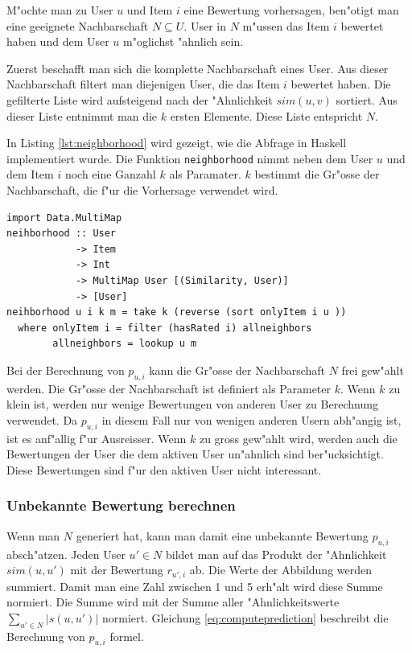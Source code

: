 \documentclass[a4paper, 12pt]{article}
\begin{document}
M"ochte man zu User $u$ und Item $i$ eine Bewertung vorhersagen, ben"otigt man eine geeignete Nachbarschaft $N \subseteq U$. User in $N$ m"ussen das Item $i$ bewertet haben und dem User $u$ m"oglichst "ahnlich sein.

Zuerst beschafft man sich die komplette Nachbarschaft eines User. Aus dieser Nachbarschaft filtert man diejenigen User, die das Item $i$ bewertet haben. Die gefilterte Liste wird aufsteigend nach der "Ahnlichkeit $sim(u,v)$ sortiert. Aus dieser Liste entnimmt man die $k$ ersten Elemente. Diese Liste entspricht $N$. 

In Listing \ref{lst:neighborhood} wird gezeigt, wie die Abfrage in Haskell implementiert wurde. Die Funktion \verb|neighborhood| nimmt neben dem User $u$ und dem Item $i$ noch eine Ganzahl $k$ als Paramater. $k$ bestimmt die Gr"osse der Nachbarschaft, die f"ur die Vorhersage verwendet wird.

\begin{lstlisting}[caption=Funktion um die Nachbarschaft f"ur ein User und ein Item zu generieren, label=lst:neighborhood]
import Data.MultiMap
neihborhood :: User
            -> Item
            -> Int
            -> MultiMap User [(Similarity, User)]
            -> [User]
neihborhood u i k m = take k (reverse (sort onlyItem i u ))
  where onlyItem i = filter (hasRated i) allneighbors
        allneighbors = lookup u m
\end{lstlisting}

Bei der Berechnung von $p_{u,i}$ kann die Gr"osse der Nachbarschaft $N$ frei gew"ahlt werden. Die Gr"osse der Nachbarschaft ist definiert als Parameter $k$. Wenn $k$ zu klein ist, werden nur wenige Bewertungen von anderen User zu Berechnung verwendet. Da $p_{u,i}$ in diesem Fall nur von wenigen anderen Usern abh"angig ist, ist es anf"allig f"ur Ausreisser. Wenn $k$ zu gross gew"ahlt wird, werden auch die Bewertungen der User die dem aktiven User un"ahnlich sind ber"ucksichtigt. Diese Bewertungen sind f"ur den aktiven User nicht interessant. 

\subsubsection{Unbekannte Bewertung berechnen}
\label{sec:predict}

Wenn man $N$ generiert hat, kann man damit eine unbekannte Bewertung $p_{u,i}$ absch"atzen. Jeden User $u' \in N$ bildet man auf das Produkt der "Ahnlichkeit $sim(u,u')$ mit der Bewertung $r_{u',i}$ ab. Die Werte der Abbildung werden summiert. Damit man eine Zahl zwischen 1 und 5 erh"alt wird diese Summe normiert. Die Summe wird mit der Summe aller "Ahnlichkeitswerte $\sum_{u' \in N}{|s(u,u')|}$ normiert. Gleichung \ref{eq:computeprediction} beschreibt die Berechnung von $p_{u,i}$ formel.
\end{document}
